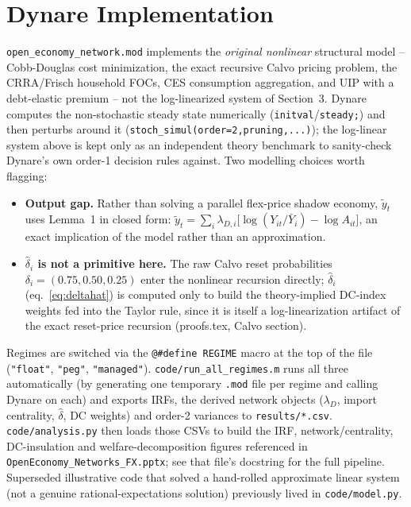 \documentclass[11pt,a4paper]{article}
\newcommand{\wh}[1]{\widehat{#1}}
\providecommand{\tl}[1]{\widetilde{#1}}
\begin{document}
\section{Dynare Implementation}

\texttt{open\_economy\_network.mod} implements the \emph{original nonlinear}
structural model -- Cobb-Douglas cost minimization, the exact recursive
Calvo pricing problem, the CRRA/Frisch household FOCs, CES consumption
aggregation, and UIP with a debt-elastic premium -- not the
log-linearized system of Section~3. Dynare computes the non-stochastic
steady state numerically (\texttt{initval}/\texttt{steady;}) and then
perturbs around it (\texttt{stoch\_simul(order=2,pruning,...)}); the
log-linear system above is kept only as an independent theory benchmark
to sanity-check Dynare's own order-1 decision rules against. Two
modelling choices worth flagging:
\begin{itemize}
\item \textbf{Output gap.} Rather than solving a parallel flex-price
  shadow economy, $\tl y_t$ uses Lemma~1 in closed form: $\tl y_t =
  \sum_i\lambda_{D,i}\bigl[\log(Y_{it}/\bar Y_i)-\log A_{it}\bigr]$,
  an exact implication of the model rather than an approximation.
\item \textbf{$\wh\delta_i$ is not a primitive here.} The raw Calvo
  reset probabilities $\delta_i=(0.75,0.50,0.25)$ enter the nonlinear
  recursion directly; $\wh\delta_i$ (eq.~\ref{eq:deltahat}) is computed
  only to build the theory-implied DC-index weights fed into the
  Taylor rule, since it is itself a log-linearization artifact of the
  exact reset-price recursion (proofs.tex, Calvo section).
\end{itemize}

Regimes are switched via the \texttt{@\#define REGIME} macro at the top
of the file (\texttt{"float"}, \texttt{"peg"}, \texttt{"managed"}).
\texttt{code/run\_all\_regimes.m} runs all three automatically (by
generating one temporary \texttt{.mod} file per regime and calling
Dynare on each) and exports IRFs, the derived network objects
($\lambda_D$, import centrality, $\wh\delta$, DC weights) and order-2
variances to \texttt{results/*.csv}. \texttt{code/analysis.py} then
loads those CSVs to build the IRF, network/centrality, DC-insulation and
welfare-decomposition figures referenced in
\texttt{OpenEconomy\_Networks\_FX.pptx}; see that file's docstring for
the full pipeline. Superseded illustrative code that solved a hand-rolled
approximate linear system (not a genuine rational-expectations solution)
previously lived in \texttt{code/model.py}.
\end{document}
